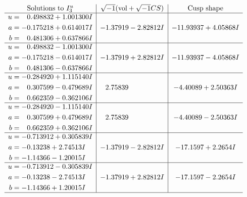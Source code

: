 \documentclass[1p]{elsarticle_modified}
\theoremstyle{definition}
\newcommand{\I}{\sqrt{-1}}
\begin{document}
$$\begin{array}{c|c|c}  
\text{Solutions to }I^u_{3}& \I (\text{vol} + \sqrt{-1}CS) & \text{Cusp shape}\\
 \hline 
\begin{aligned}
u &= \phantom{-}0.498832 + 1.001300 I \\
a &= -0.175218 + 0.614017 I \\
b &= \phantom{-}0.481306 + 0.637866 I\end{aligned}
 & -1.37919 - 2.82812 I & -11.93937 + 4.05868 I \\ \hline\begin{aligned}
u &= \phantom{-}0.498832 - 1.001300 I \\
a &= -0.175218 - 0.614017 I \\
b &= \phantom{-}0.481306 - 0.637866 I\end{aligned}
 & -1.37919 + 2.82812 I & -11.93937 - 4.05868 I \\ \hline\begin{aligned}
u &= -0.284920 + 1.115140 I \\
a &= \phantom{-}0.307599 - 0.479689 I \\
b &= \phantom{-}0.662359 - 0.362106 I\end{aligned}
 & \phantom{-}2.75839\phantom{ +0.000000I} & -4.40089 + 2.50363 I \\ \hline\begin{aligned}
u &= -0.284920 - 1.115140 I \\
a &= \phantom{-}0.307599 + 0.479689 I \\
b &= \phantom{-}0.662359 + 0.362106 I\end{aligned}
 & \phantom{-}2.75839\phantom{ +0.000000I} & -4.40089 - 2.50363 I \\ \hline\begin{aligned}
u &= -0.713912 + 0.305839 I \\
a &= -0.13238 + 2.74513 I \\
b &= -1.14366 - 1.20015 I\end{aligned}
 & -1.37919 - 2.82812 I & -17.1597 + 2.2654 I \\ \hline\begin{aligned}
u &= -0.713912 - 0.305839 I \\
a &= -0.13238 - 2.74513 I \\
b &= -1.14366 + 1.20015 I\end{aligned}
 & -1.37919 + 2.82812 I & -17.1597 - 2.2654 I\\
 \hline 
 \end{array}$$\newpage\newpage\renewcommand{\arraystretch}{1}
\end{document}
